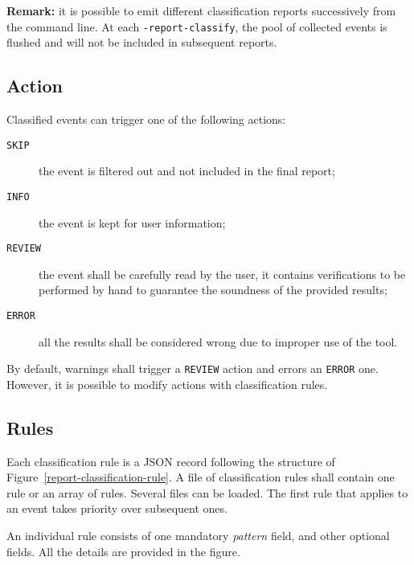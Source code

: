 \textbf{Remark:} it is possible to emit different classification reports successively
from the command line. At each \verb+-report-classify+, the pool of collected events is flushed
and will not be included in subsequent reports.

\subsection{Action}

Classified events can trigger one of the following actions:
\begin{description}
\item[\tt SKIP] the event is filtered out and not included in the final report;
\item[\tt INFO] the event is kept for user information;
\item[\tt REVIEW] the event shall be carefully read by the user, it contains
  verifications to be performed by hand to guarantee the soundness of the provided results;
\item[\tt ERROR] all the results shall be considered wrong due to improper use of the tool.
\end{description}

By default, \FramaC warnings shall trigger a \texttt{REVIEW} action and errors an \texttt{ERROR}
one. However, it is possible to modify actions with classification rules.

\subsection{Rules}

Each classification rule is a JSON record following the structure of Figure~\ref{report-classification-rule}.
A file of classification rules shall contain one rule or an array of rules. Several files can be loaded.
The first rule that applies to an event takes priority over subsequent ones.

An individual rule consists of one mandatory \emph{pattern} field, and other optional fields. All the details
are provided in the figure.

